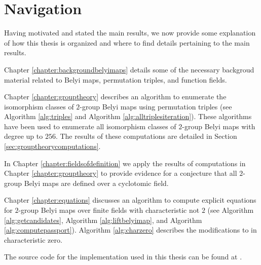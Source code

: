 \documentclass{dcthesis}
\numberwithin{equation}{section}
\theoremstyle{definition}
\theoremstyle{remark}
\begin{document}
{{  \section{Navigation}{\label{sec:navigation}
    Having motivated and stated the main
    results, we now provide
    some explanation of how this thesis is
    organized
    and where to find details pertaining
    to the main results.
    \par
    Chapter \ref{chapter:backgroundbelyimaps}
    details some of the
    necessary backgroud material
    related to Belyi maps,
    permutation triples,
    and function fields.
    \par
    Chapter \ref{chapter:grouptheory}
    describes an algorithm
    to enumerate the
    isomorphism classes
    of $2$-group Belyi maps
    using permutation triples
    (see
    Algorithm \ref{alg:triples}
    and
    Algorithm \ref{alg:alltriplesiteration}).
    These algorithms have been used to
    enumerate all isomorphism classes of
    $2$-group Belyi maps with degree
    up to $256$.
    The results of these computations are
    detailed in
    Section \ref{sec:grouptheorycomputations}.
    \par
    In Chapter \ref{chapter:fieldsofdefinition}
    we apply the results of
    computations in
    Chapter \ref{chapter:grouptheory}
    to provide evidence for a conjecture
    that all
    $2$-group Belyi maps
    are defined over a cyclotomic field.
    \par
    Chapter \ref{chapter:equations}
    discusses an algorithm to
    compute explicit equations
    for $2$-group Belyi maps
    over finite fields with
    characteristic not $2$
    (see
    Algorithm \ref{alg:getcandidates},
    Algorithm \ref{alg:liftbelyimap},
    and
    Algorithm \ref{alg:computepassport}).
    Algorithm \ref{alg:charzero}
    describes the modifications to
    in characteristic zero.
    \par
    The source code for the implementation used
    in this thesis can be found at
    \cite{twogroupdessins}.
  }
}}
\end{document}
